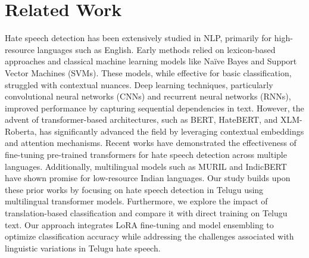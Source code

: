 \section{Related Work}
Hate speech detection has been extensively studied in NLP, primarily for high-resource languages such as English. Early methods relied on lexicon-based approaches and classical machine learning models like Naïve Bayes and Support Vector Machines (SVMs). These models, while effective for basic classification, struggled with contextual nuances. Deep learning techniques, particularly convolutional neural networks (CNNs) and recurrent neural networks (RNNs), improved performance by capturing sequential dependencies in text. However, the advent of transformer-based architectures, such as BERT, HateBERT, and XLM-Roberta, has significantly advanced the field by leveraging contextual embeddings and attention mechanisms. Recent works have demonstrated the effectiveness of fine-tuning pre-trained transformers for hate speech detection across multiple languages. Additionally, multilingual models such as MURIL and IndicBERT have shown promise for low-resource Indian languages. Our study builds upon these prior works by focusing on hate speech detection in Telugu using multilingual transformer models. Furthermore, we explore the impact of translation-based classification and compare it with direct training on Telugu text. Our approach integrates LoRA fine-tuning and model ensembling to optimize classification accuracy while addressing the challenges associated with linguistic variations in Telugu hate speech.